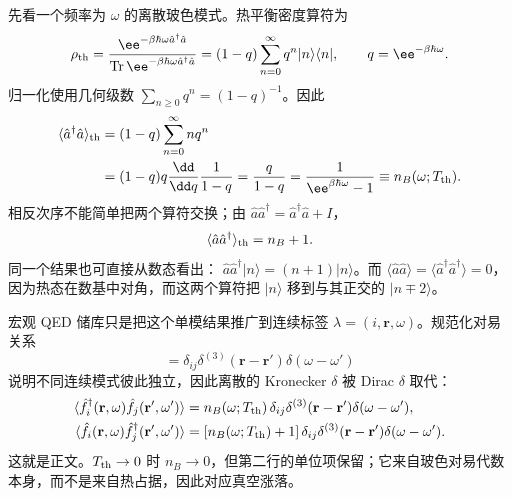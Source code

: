 \begin{derivation}
先看一个频率为 $\omega$ 的离散玻色模式。热平衡密度算符为
\begin{equation*}
 \rho_{\rm th}
 =\frac{\ee^{-\beta\hbar\omega\hat a^\dagger\hat a}}
 {\operatorname{Tr}\ee^{-\beta\hbar\omega\hat a^\dagger\hat a}}
 =(1-q)\sum_{n=0}^{\infty}q^n|n\rangle\langle n|,
 \qquad q=\ee^{-\beta\hbar\omega}.
\end{equation*}
归一化使用几何级数 $\sum_{n\ge0}q^n=(1-q)^{-1}$。因此
\begin{align*}
 \langle\hat a^\dagger\hat a\rangle_{\rm th}
 &=(1-q)\sum_{n=0}^{\infty}nq^n\\
 &=(1-q)q\frac{\dd}{\dd q}\frac{1}{1-q}
 =\frac{q}{1-q}
 =\frac{1}{\ee^{\beta\hbar\omega}-1}
 \equiv n_B(\omega;T_{\rm th}).
\end{align*}
相反次序不能简单把两个算符交换；由
$\hat a\hat a^\dagger=\hat a^\dagger\hat a+I$，
\begin{equation*}
 \langle\hat a\hat a^\dagger\rangle_{\rm th}
 =n_B+1.
\end{equation*}
同一个结果也可直接从数态看出：
$\hat a\hat a^\dagger|n\rangle=(n+1)|n\rangle$。而
$\langle\hat a\hat a\rangle=\langle\hat a^\dagger\hat a^\dagger\rangle=0$，因为热态在数基中对角，而这两个算符把 $|n\rangle$ 移到与其正交的 $|n\mp2\rangle$。

宏观 QED 储库只是把这个单模结果推广到连续标签
$\lambda=(i,\mathbf r,\omega)$。规范化对易关系
\begin{equation*}
 [\hat f_i(\mathbf r,\omega),
 \hat f_j^\dagger(\mathbf r',\omega')]
 =\delta_{ij}\delta^{(3)}(\mathbf r-\mathbf r')
 \delta(\omega-\omega')
\end{equation*}
说明不同连续模式彼此独立，因此离散的 Kronecker $\delta$ 被 Dirac $\delta$ 取代：
\begin{align*}
 \langle\hat f_i^\dagger(\mathbf r,\omega)
 \hat f_j(\mathbf r',\omega')\rangle
 &=n_B(\omega;T_{\rm th})\,
 \delta_{ij}\delta^{(3)}(\mathbf r-\mathbf r')\delta(\omega-\omega'),\\
 \langle\hat f_i(\mathbf r,\omega)
 \hat f_j^\dagger(\mathbf r',\omega')\rangle
 &=[n_B(\omega;T_{\rm th})+1]\,
 \delta_{ij}\delta^{(3)}(\mathbf r-\mathbf r')\delta(\omega-\omega').
\end{align*}
这就是正文。$T_{\rm th}\to0$ 时 $n_B\to0$，但第二行的单位项保留；它来自玻色对易代数本身，而不是来自热占据，因此对应真空涨落。
\end{derivation}
